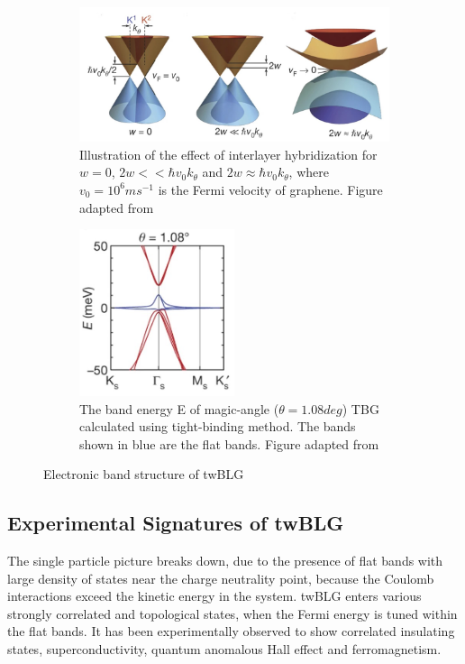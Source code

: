 \begin{figure}[H]
     \centering
     \begin{subfigure}[b]{0.8\textwidth}
         \centering
         \includegraphics[width=\textwidth]{figures/twblg_hyb.jpg}
         \caption{Illustration of the effect of interlayer hybridization for $w=0$, $2w<<\hbar v_0 k_\theta$ and $2w\approx \hbar v_0 k_\theta$, where $v_0=10^6ms^{-1}$ is the Fermi velocity of graphene. Figure adapted from \cite{Cao2018}}
     \end{subfigure}
     
     \begin{subfigure}[b]{0.8\textwidth}
         \centering
         \includegraphics[width=0.5\textwidth]{figures/flatband.jpg}
         \caption{The band energy E of magic-angle ($\theta=1.08deg$) TBG calculated using tight-binding method. The bands shown in blue are the flat bands. Figure adapted from \cite{Cao2018}}
     \end{subfigure}
\caption{Electronic band structure of twBLG}
\end{figure}

\subsection{Experimental Signatures of twBLG}
The single particle picture breaks down, due to the presence of flat bands with large density of states near the charge neutrality point, because the Coulomb interactions exceed the kinetic energy in the system. twBLG enters various strongly correlated and topological states, when the Fermi energy is tuned within the flat bands. It has been experimentally observed to show correlated insulating states, superconductivity, quantum anomalous Hall effect and ferromagnetism.

